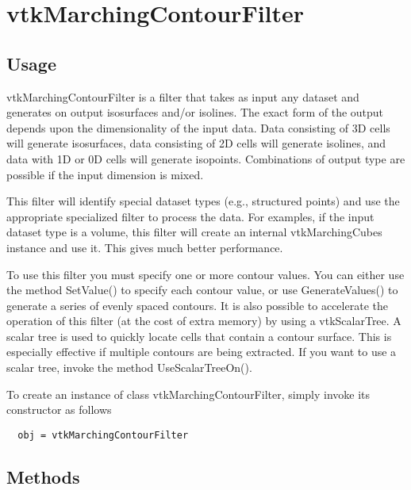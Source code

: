 \section{vtkMarchingContourFilter}

\subsection{Usage}

 vtkMarchingContourFilter is a filter that takes as input any dataset and 
 generates on output isosurfaces and/or isolines. The exact form 
 of the output depends upon the dimensionality of the input data. 
 Data consisting of 3D cells will generate isosurfaces, data 
 consisting of 2D cells will generate isolines, and data with 1D 
 or 0D cells will generate isopoints. Combinations of output type 
 are possible if the input dimension is mixed.

 This filter will identify special dataset types (e.g., structured
 points) and use the appropriate specialized filter to process the
 data. For examples, if the input dataset type is a volume, this
 filter will create an internal vtkMarchingCubes instance and use
 it. This gives much better performance.
 
 To use this filter you must specify one or more contour values.
 You can either use the method SetValue() to specify each contour
 value, or use GenerateValues() to generate a series of evenly
 spaced contours. It is also possible to accelerate the operation of
 this filter (at the cost of extra memory) by using a
 vtkScalarTree. A scalar tree is used to quickly locate cells that
 contain a contour surface. This is especially effective if multiple
 contours are being extracted. If you want to use a scalar tree,
 invoke the method UseScalarTreeOn().

To create an instance of class vtkMarchingContourFilter, simply
invoke its constructor as follows
\begin{verbatim}
  obj = vtkMarchingContourFilter
\end{verbatim}
\subsection{Methods}


